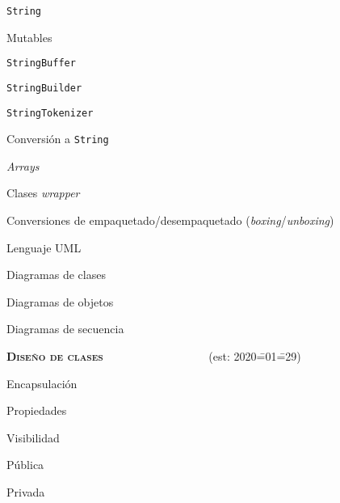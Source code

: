 \begin{longenum}
\begin{longenum}
\begin{longenum}
\begin{longenum}
\begin{longenum}
                    \item \texttt{String}
                \end{longenum}
                \item Mutables
                \begin{longenum}
                    \item \texttt{StringBuffer}
                    \item \texttt{StringBuilder}
                    \item \texttt{StringTokenizer}
                \end{longenum}
                \item Conversión a \texttt{String}
            \end{longenum}
            \item \textit{Arrays}
            \item Clases \textit{wrapper}
            \begin{longenum}
                \item Conversiones de empaquetado/desempaquetado (\textit{boxing}/\textit{unboxing})
            \end{longenum}
        \end{longenum}
        \item Lenguaje UML
        \begin{longenum}
            \item Diagramas de clases
            \item Diagramas de objetos
            \item Diagramas de secuencia
        \end{longenum}
    \end{longenum}
    \item \textbf{\textsc{Diseño de clases}} \ \ \ \ \ \ \ \ \ \ \ \ \ \ \ \ \ \ (est: 2020\==01\==29)
    \begin{longenum}
        \item Encapsulación
        \item Propiedades
        \begin{longenum}
            \item Visibilidad
            \begin{longenum}
                \item Pública
                \item Privada
            \end{longenum}

\end{longenum}
\end{longenum}
\end{longenum}
